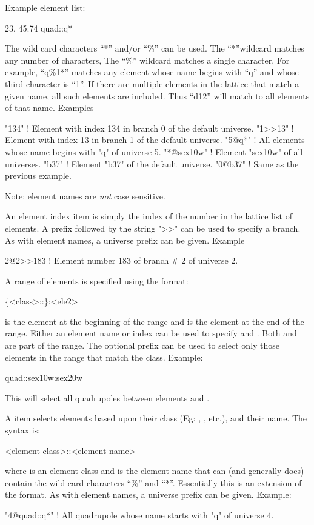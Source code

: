 Example element list:
\begin{example}
  23, 45:74 quad::q*
\end{example}

The wild card characters ``*'' and/or ``\%'' can be used. The ``*''wildcard matches any number of
characters, The ``\%'' wildcard matches a single character. For example, ``q\%1*'' matches any
element whose name begins with ``q'' and whose third character is ``1''.  If there are multiple
elements in the lattice that match a given name, all such elements are included. Thus ``d12'' will
match to all elements of that name. Examples
\begin{example}
  "134"        ! Element with index 134 in branch 0 of the default universe.
  "1>>13"      ! Element with index 13 in branch 1 of the default universe.
  "5@q*"       ! All elements whose name begins with "q" of universe 5.
  "*@sex10w"   ! Element "sex10w" of all universes.
  "b37"        ! Element "b37" of the default universe.
  "0@b37"      ! Same as the previous example.
\end{example}
Note: element names are {\em not} case sensitive.

An element index item is simply the index of the number in the lattice list of elements. A prefix
followed by the string ">>" can be used to specify a branch. As with element names, a universe
prefix can be given. Example
\begin{example}
  2@2>>183   ! Element number 183 of branch \# 2 of universe 2.
\end{example}

A range of elements is specified using the format:
\begin{example}
  \{<class>::\}<ele1>:<ele2>
\end{example}
 is the element at the beginning of the range and  is the element at the end
of the range. Either an element name or index can be used to specify  and
. Both  and  are part of the range. The optional 
prefix can be used to select only those elements in the range that match the class.  Example:
\begin{example}
  quad::sex10w:sex20w
\end{example}
This will select all quadrupoles between elements  and .

A  item
selects elements based upon their class (Eg: ,
, etc.), and their name. The syntax is:
\begin{example}
  <element class>::<element name>
\end{example}
where  is an element class and  is the element name that can
(and generally does) contain the wild card characters ``\%'' and ``*''. Essentially this is an
extension of the  format. As with element names, a universe prefix can be
given. Example:
\begin{example}
  "4@quad::q*"   ! All quadrupole whose name starts with "q" of universe 4.
\end{example}

